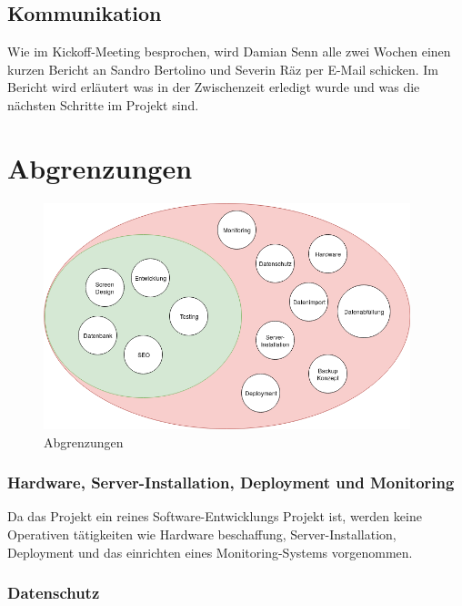 \subsection{Kommunikation}\label{kommunikation}

Wie im Kickoff-Meeting besprochen, wird Damian Senn alle zwei Wochen einen
kurzen Bericht an Sandro Bertolino und Severin Räz per E-Mail schicken.
Im Bericht wird erläutert was in der Zwischenzeit erledigt wurde und was
die nächsten Schritte im Projekt sind.

\clearpage

\section{Abgrenzungen}\label{abgrenzungen}

\begin{figure}[!htb]
  \centering
  \includegraphics[width=0.95\textwidth]{figures/abgrenzungen.png}
  \caption{Abgrenzungen}
\end{figure}

\subsubsection{Hardware, Server-Installation, Deployment und
  Monitoring}\label{hardware-server-installation-deployment-und-monitoring}

Da das Projekt ein reines Software-Entwicklungs Projekt ist, werden
keine Operativen tätigkeiten wie Hardware beschaffung,
Server-Installation, Deployment und das einrichten eines
Monitoring-Systems vorgenommen.

\subsubsection{Datenschutz}\label{datenschutz}

